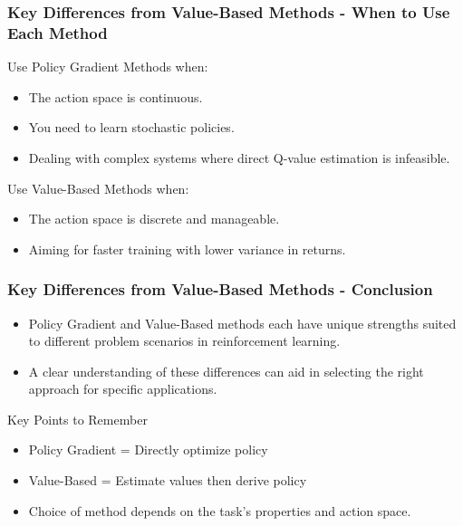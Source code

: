 \documentclass{beamer}
\begin{document}
\begin{frame}[fragile]
    \frametitle{Key Differences from Value-Based Methods - When to Use Each Method}
    \begin{block}{Use Policy Gradient Methods when:}
        \begin{itemize}
            \item The action space is continuous.
            \item You need to learn stochastic policies.
            \item Dealing with complex systems where direct Q-value estimation is infeasible.
        \end{itemize}
    \end{block}
    
    \begin{block}{Use Value-Based Methods when:}
        \begin{itemize}
            \item The action space is discrete and manageable.
            \item Aiming for faster training with lower variance in returns.
        \end{itemize}
    \end{block}
\end{frame}

\begin{frame}[fragile]
    \frametitle{Key Differences from Value-Based Methods - Conclusion}
    \begin{itemize}
        \item Policy Gradient and Value-Based methods each have unique strengths suited to different problem scenarios in reinforcement learning.
        \item A clear understanding of these differences can aid in selecting the right approach for specific applications.
    \end{itemize}
    
    \begin{block}{Key Points to Remember}
        \begin{itemize}
            \item Policy Gradient = Directly optimize policy
            \item Value-Based = Estimate values then derive policy
            \item Choice of method depends on the task's properties and action space.
        \end{itemize}
    \end{block}
\end{frame}
\end{document}
